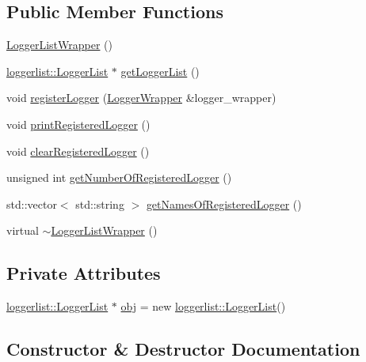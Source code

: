 \subsection*{Public Member Functions}
\begin{DoxyCompactItemize}
\item 
\mbox{\hyperlink{class_logger_list_wrapper_a3fe4bdd693b9d4a42e360b944466392d}{Logger\+List\+Wrapper}} ()
\item 
\mbox{\hyperlink{classloggerlist_1_1_logger_list}{loggerlist\+::\+Logger\+List}} $\ast$ \mbox{\hyperlink{class_logger_list_wrapper_ab128c208c6cd017de1cfe08f3e996b2a}{get\+Logger\+List}} ()
\item 
void \mbox{\hyperlink{class_logger_list_wrapper_a428932ced69ba53f256b832a94563524}{register\+Logger}} (\mbox{\hyperlink{class_logger_wrapper}{Logger\+Wrapper}} \&logger\+\_\+wrapper)
\item 
void \mbox{\hyperlink{class_logger_list_wrapper_a9b23823777868fc0f0e9778f7eb48fcf}{print\+Registered\+Logger}} ()
\item 
void \mbox{\hyperlink{class_logger_list_wrapper_a501bae5e1dda3dba04b2915d7dbbe3a7}{clear\+Registered\+Logger}} ()
\item 
unsigned int \mbox{\hyperlink{class_logger_list_wrapper_aa95c80ea66ee0237ba97adaaddbb991d}{get\+Number\+Of\+Registered\+Logger}} ()
\item 
std\+::vector$<$ std\+::string $>$ \mbox{\hyperlink{class_logger_list_wrapper_a0bb53b6ac23b216e4f2f55757c99a458}{get\+Names\+Of\+Registered\+Logger}} ()
\item 
virtual \mbox{\hyperlink{class_logger_list_wrapper_a7f1ce15633d9ec914696d0c9c1d93935}{$\sim$\+Logger\+List\+Wrapper}} ()
\end{DoxyCompactItemize}
\subsection*{Private Attributes}
\begin{DoxyCompactItemize}
\item 
\mbox{\hyperlink{classloggerlist_1_1_logger_list}{loggerlist\+::\+Logger\+List}} $\ast$ \mbox{\hyperlink{class_logger_list_wrapper_a399fe67a339604a00e2b7654a4aba97c}{obj}} = new \mbox{\hyperlink{classloggerlist_1_1_logger_list}{loggerlist\+::\+Logger\+List}}()
\end{DoxyCompactItemize}


\subsection{Constructor \& Destructor Documentation}
\mbox{\label{class_logger_list_wrapper_a3fe4bdd693b9d4a42e360b944466392d}} 
